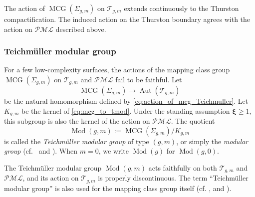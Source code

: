 \documentclass[dvipdfmx]{amsart}
\theoremstyle{remark}
\newcommand{\teich}{\mathcal{T}}
\newcommand{\mcg}{\operatorname{MCG}}
\newcommand{\tmod}{\operatorname{Mod}}
\newcommand{\convgenus}{{\boldsymbol \xi}}
\newcommand{\pml}{\mathcal{PML}}
\begin{document}
The action of $\mcg(\Sigma_{g,m})$ on $\teich_{g,m}$ extends
continuously to the Thurston compactification. The induced action on
the Thurston boundary agrees with the action on $\pml$ described
above.

\subsubsection*{Teichm\"uller modular group}
For a few low-complexity surfaces, the actions of the mapping class group
$\mcg(\Sigma_{g,m})$ on $\teich_{g,m}$ and $\pml$ fail to be
faithful. Let
\begin{equation}
\label{eq:mcg_to_tmod}
\mcg(\Sigma_{g,m})
\longrightarrow
\operatorname{Aut}(\teich_{g,m})
\end{equation}
be the natural homomorphism defined by \eqref{eq:action_of_mcg_Teichmuller}.
Let $K_{g,m}$ be the kernel of \eqref{eq:mcg_to_tmod}.
Under the standing assumption $\convgenus\ge1$, this subgroup is
also the kernel of the action on $\pml$. The quotient
\[
\tmod(g,m)
:=
\mcg(\Sigma_{g,m})/K_{g,m}
\]
is called the \emph{Teichm\"uller modular group} of type $(g,m)$, or simply the \emph{modular group} (cf.\ \cite[\S 2]{Bers1981} and \cite[\S 1]{BersBoundary1981}).
When $m=0$, we write $\tmod(g)$ for $\tmod(g,0)$.

The Teichm\"uller modular group $\tmod(g,m)$ acts faithfully on both $\teich_{g,m}$ and $\pml$, and its action on $\teich_{g,m}$ is properly discontinuous.
The term ``Teichm\"uller modular group'' is also used for the
mapping class group itself (cf. \cite{ImayoshiTaniguchi1992}, \cite{Ivanov1992} and \cite{Mumford1967}).
\end{document}
